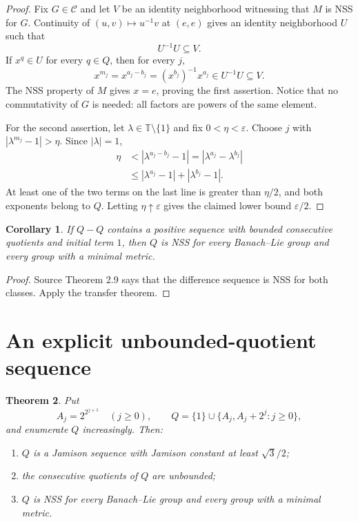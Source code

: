 \documentclass[11pt]{article}
\newtheorem{theorem}{Theorem}
\newtheorem{corollary}[theorem]{Corollary}
\newcommand{\T}{\mathbb T}
\begin{document}
\begin{proof}
Fix $G\in\mathcal C$ and let $V$ be an identity neighborhood witnessing that
$M$ is NSS for $G$.  Continuity of $(u,v)\mapsto u^{-1}v$ at $(e,e)$ gives an
identity neighborhood $U$ such that
\[
  U^{-1}U\subseteq V.
\]
If $x^{q}\in U$ for every $q\in Q$, then for every $j$,
\[
  x^{m_j}=x^{a_j-b_j}=(x^{b_j})^{-1}x^{a_j}\in U^{-1}U\subseteq V.
\]
The NSS property of $M$ gives $x=e$, proving the first assertion.  Notice that
no commutativity of $G$ is needed: all factors are powers of the same element.

For the second assertion, let $\lambda\in\T\setminus\{1\}$ and fix
$0<\eta<\varepsilon$.  Choose $j$ with
$|\lambda^{m_j}-1|>\eta$.  Since $|\lambda|=1$,
\begin{align*}
 \eta
 &< |\lambda^{a_j-b_j}-1|
  =|\lambda^{a_j}-\lambda^{b_j}|\\
 &\le |\lambda^{a_j}-1|+|\lambda^{b_j}-1|.
\end{align*}
At least one of the two terms on the last line is greater than $\eta/2$, and
both exponents belong to $Q$.  Letting $\eta\uparrow\varepsilon$ gives the
claimed lower bound $\varepsilon/2$.
\end{proof}

\begin{corollary}
If $Q-Q$ contains a positive sequence with bounded consecutive quotients and
initial term $1$, then $Q$ is NSS for every Banach--Lie group and every group
with a minimal metric.
\end{corollary}

\begin{proof}
Source Theorem 2.9 \cite{BDG} says that the difference sequence is NSS for
both classes.  Apply the transfer theorem.
\end{proof}

\section{An explicit unbounded-quotient sequence}

\begin{theorem}
Put
\[
 A_j=2^{2^{j+1}}\quad(j\ge0),
 \qquad
 Q=\{1\}\cup\{A_j,A_j+2^j:j\ge0\},
\]
and enumerate $Q$ increasingly.  Then:
\begin{enumerate}
\item $Q$ is a Jamison sequence with Jamison constant at least
      $\sqrt3/2$;
\item the consecutive quotients of $Q$ are unbounded;
\item $Q$ is NSS for every Banach--Lie group and every group with a minimal
      metric.
\end{enumerate}
\end{theorem}
\end{document}
